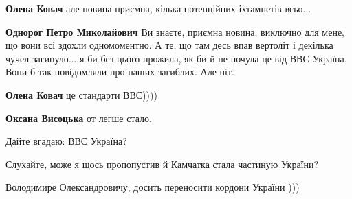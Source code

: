\begin{itemize}
\begin{itemize}
\textbf{Олена Ковач} але новина приємна, кілька потенційних іхтамнетів всьо...

\begin{itemize}


\textbf{Однорог Петро Миколайович} Ви знаєте, приємна новина, виключно для
мене, що вони всі здохли одномоментно. А те, що там десь впав вертоліт і
декілька чучел загинуло... я би без цього прожила, як би й не почула це від ВВС
Україна. Вони б так повідомляли про наших загиблих. Але ніт.
\end{itemize}

 
\textbf{Олена Ковач} це стандарти ВВС))))

\begin{itemize}
 
\textbf{Оксана Висоцька} от легше стало.
\end{itemize}


\end{itemize}

 
Дайте вгадаю: ВВС Україна?

 

Слухайте, може я щось пропопустив й Камчатка стала частиную України?

Володимире Олександровичу, досить переносити кордони України )))



\end{itemize}
